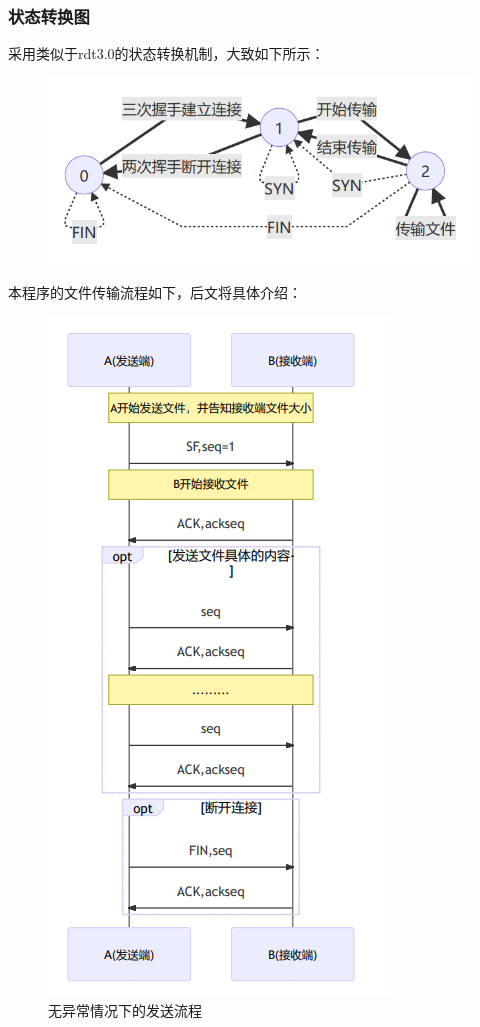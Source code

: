 \documentclass[UTF8,a4paper,10pt]{ctexart}
\begin{document}
\subsubsection{状态转换图}
采用类似于rdt3.0的状态转换机制，大致如下所示：
\begin{figure}[H]
    \centering
    \includegraphics[scale=0.8]{计网3.png}
    \label{fig:3}
\end{figure}
本程序的文件传输流程如下，后文将具体介绍：
\begin{figure}[H]
    \centering
    \includegraphics[scale=1.0]{计网4.png}
    \caption{无异常情况下的发送流程}
    \label{fig:4}
\end{figure}
\end{document}
